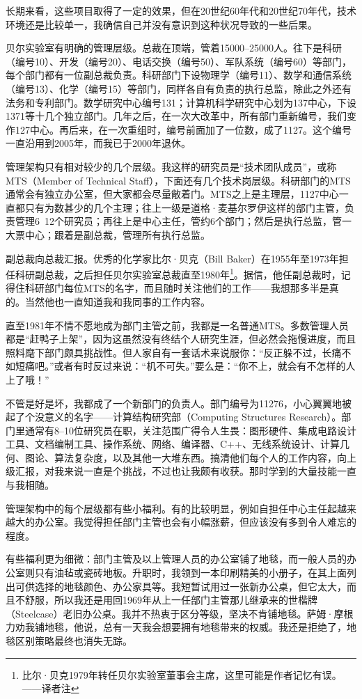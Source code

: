 \documentclass[a4paper,12pt,UTF8,twoside]{ctexbook}
\begin{document}
长期来看，这些项目取得了一定的效果，但在20世纪60年代和20世纪70年代，技术环境还是比较单一，我确信自己并没有意识到这种状况导致的一些后果。

贝尔实验室有明确的管理层级。总裁在顶端，管着15000--25000人。往下是科研（编号10）、开发（编号20）、电话交换（编号50）、军队系统（编号60）等部门，每个部门都有一位副总裁负责。科研部门下设物理学（编号11）、数学和通信系统（编号13）、化学（编号15）等部门，同样各自有负责的执行总监，除此之外还有法务和专利部门。数学研究中心编号131；计算机科学研究中心划为137中心，下设1371等十几个独立部门。几年之后，在一次大改革中，所有部门重新编号，我们变作127中心。再后来，在一次重组时，编号前面加了一位数，成了1127。这个编号一直沿用到2005年，而我已于2000年退休。

管理架构只有相对较少的几个层级。我这样的研究员是“技术团队成员”，或称MTS（Member of Technical Staff），下面还有几个技术岗层级。科研部门的MTS通常会有独立办公室，但大家都会尽量敞着门。MTS之上是主理层，1127中心一直都只有为数甚少的几个主理；往上一级是道格·麦基尔罗伊这样的部门主管，负责管理6~12个研究员；再往上是中心主任，管约6个部门；然后是执行总监，管一大票中心；跟着是副总裁，管理所有执行总监。

副总裁向总裁汇报。优秀的化学家比尔·贝克（Bill Baker）在1955年至1973年担任科研副总裁，之后担任贝尔实验室总裁直至1980年\footnote{比尔·贝克1979年转任贝尔实验室董事会主席，这里可能是作者记忆有误。——译者注}。据信，他任副总裁时，记得住科研部门每位MTS的名字，而且随时关注他们的工作——我想那多半是真的。当然他也一直知道我和我同事的工作内容。

直至1981年不情不愿地成为部门主管之前，我都是一名普通MTS。多数管理人员都是“赶鸭子上架”，因为这虽然没有终结个人研究生涯，但必然会拖慢进度，而且照料麾下部门颇具挑战性。但人家自有一套话术来说服你：“反正躲不过，长痛不如短痛吧。”或者有时反过来说：“机不可失。”要么是：“你不上，就会有不怎样的人上了哦！”

不管是好是坏，我都成了一个新部门的负责人。部门编号为11276，小心翼翼地被起了个没意义的名字——计算结构研究部（Computing Structures Research）。部门里通常有8--10位研究员在职，关注范围广得令人生畏：图形硬件、集成电路设计工具、文档编制工具、操作系统、网络、编译器、C++、无线系统设计、计算几何、图论、算法复杂度，以及其他一大堆东西。搞清他们每个人的工作内容，向上级汇报，对我来说一直是个挑战，不过也让我颇有收获。那时学到的大量技能一直与我相随。

管理架构中的每个层级都有些小福利。有的比较明显，例如自担任中心主任起越来越大的办公室。我觉得担任部门主管也会有小幅涨薪，但应该没有多到令人难忘的程度。

有些福利更为细微：部门主管及以上管理人员的办公室铺了地毯，而一般人员的办公室则只有油毡或瓷砖地板。升职时，我领到一本印刷精美的小册子，在其上面列出可供选择的地毯颜色、办公家具等。我短暂试用过一张新办公桌，但它太大，而且不舒服，所以我还是用回1969年从上一任部门主管那儿继承来的世楷牌（Steelcase）老旧办公桌。我并不热衷于区分等级，坚决不肯铺地毯。萨姆·摩根力劝我铺地毯，他说，总有一天我会想要拥有地毯带来的权威。我还是拒绝了，地毯区别策略最终也消失无踪。
\end{document}
